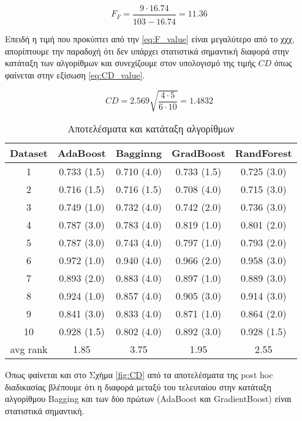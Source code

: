\begin{equation}
\label{eq:F_value}
F_F = \frac{9 \cdot 16.74}{10 \dot 3 - 16.74} = 11.36
\end{equation}

Επειδή η τιμή που προκύπτει από την \ref{eq:F_value} είναι μεγαλύτερο από το χχχ, απορίπτουμε την παραδοχή ότι δεν υπάρχει στατιστικά σημαντική διαφορά στην κατάταξη των αλγορίθμων και συνεχίζουμε στον υπολογισμό της τιμής $CD$ όπως φαίνεται στην εξίσωση \ref{eq:CD_value}.

\begin{equation}
\label{eq:CD_value}
CD = 2.569\sqrt{\frac{4\cdot 5}{6 \cdot 10}} = 1.4832
\end{equation}

\begin{table*}
	\centering
	\caption{Αποτελέσματα και κατάταξη αλγορίθμων}
	\label{tab:ranking}
	\begin{tabular}{ccccc}
		\hline
		\ttfamily Dataset & \ttfamily AdaBoost & \ttfamily Bagginng & \ttfamily GradBoost & \ttfamily RandForest
		\\	\hline
		1&	0.733 (1.5)&    0.710 (4.0) &	0.733 (1.5)&	0.725 (3.0) \\ \hline
		2&	0.716 (1.5)&    0.716 (1.5) &	0.708 (4.0)&	0.715 (3.0)\\ \hline
		3&	0.749 (1.0)&	0.732 (4.0)&	0.742 (2.0)&	0.736 (3.0) \\ \hline
		4&	0.787 (3.0)&	0.783 (4.0)&	0.819 (1.0)&	0.801 (2.0)\\ \hline
		5&	0.787 (3.0)&	0.743 (4.0)&	0.797 (1.0)&	0.793 (2.0)\\ \hline
		6&	0.972 (1.0)&	0.940 (4.0)&	0.966 (2.0)&	0.958 (3.0)\\ \hline
		7&	0.893 (2.0)&	0.883 (4.0)&	0.897 (1.0)&	0.889 (3.0)\\ \hline
		8&	0.924 (1.0)&	0.857 (4.0)&	0.905 (3.0)&	0.914 (3.0)\\ \hline
		9&	0.841 (3.0)&	0.833 (4.0)&	0.871 (1.0)&	0.864 (2.0)\\ \hline
		10&	0.928 (1.5)&	0.802 (4.0)&	0.892 (3.0)&	0.928 (1.5)\\ \hline
		avg rank&1.85 &	3.75 & 1.95 & 2.55
		\\ \hline
	\end{tabular}
\end{table*}

Όπως φαίνεται και στο Σχήμα \ref{fig:CD} από τα αποτελέσματα της post hoc διαδικασίας βλέπουμε ότι η διαφορά μεταξύ του τελευταίου στην κατάταξη αλγορίθμου Bagging και των δύο πρώτων (AdaBoost και GradientBoost) είναι στατιστικά σημαντική.

